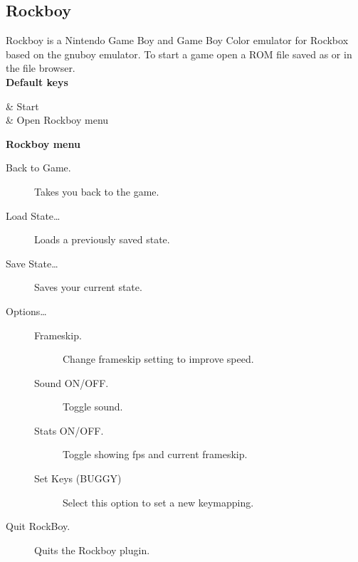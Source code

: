 \subsection{\label{ref:Rockboy}Rockboy}
Rockboy is a Nintendo Game Boy and Game Boy Color emulator for Rockbox based on
the gnuboy emulator. To start a game open a ROM file saved as  or
 in the file browser.\\

\textbf{Default keys}
\begin{table}
    \begin{btnmap}{}{}
    & Start\\
    & Open Rockboy menu\\
    \end{btnmap}
\end{table}

\textbf{Rockboy menu}
\begin{description}
\item[Back to Game.] Takes you back to the game.
\item[Load State\ldots] Loads a previously saved state.
\item[Save State\ldots] Saves your current state.
\item[Options\ldots]
    \begin{description}
    \item[Frameskip.]
    Change frameskip setting to improve speed.
    \item[Sound ON/OFF.]
    Toggle sound.
    \item[Stats ON/OFF.]
    Toggle showing fps and current frameskip.
    \item[Set Keys (BUGGY)]
    Select this option to set a new keymapping.
    \end{description}
\item[Quit RockBoy.] Quits the Rockboy plugin.
\end{description}
